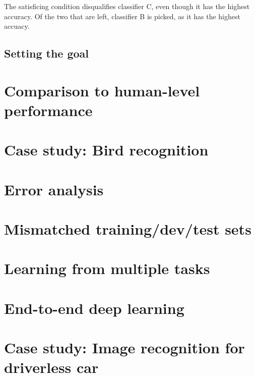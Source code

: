 \documentclass[12pt, a4paper]{article}
\numberwithin{equation}{section}
\begin{document}
The satisficing condition disqualifies classifier C, even though it has the highest accuracy. Of the two that are left, classifier B is picked, as it has the highest accuacy.

\subsection{Setting the goal}


\section{Comparison to human-level performance}


\section{Case study: Bird recognition}


\section{Error analysis}


\section{Mismatched training/dev/test sets}


\section{Learning from multiple tasks}


\section{End-to-end deep learning}


\section{Case study: Image recognition for driverless car}
\end{document}

